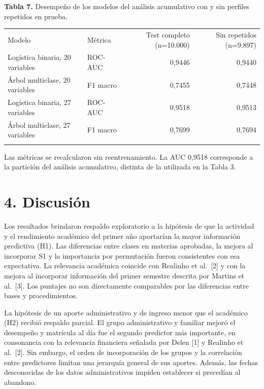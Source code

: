 \documentclass[10pt,a4paper]{article}
\newenvironment{tabla}{\par\begingroup\small
  \setlength{\LTpre}{2pt}\setlength{\LTpost}{2pt}\setlength{\tabcolsep}{4.5pt}
  \renewcommand{\arraystretch}{1.08}}{\endgroup\par}
\newcommand{\epigrafetabla}[1]{\noindent\begin{minipage}{\linewidth}\small\justifying\noindent #1\end{minipage}\par\vspace{2pt}}
\newcommand{\notatabla}[1]{\vspace{3pt}\noindent\begin{minipage}{\linewidth}\footnotesize\justifying\noindent #1\end{minipage}\par}
\renewcommand{\toprule}{\specialrule{1pt}{2pt}{2pt}}
\renewcommand{\bottomrule}{\specialrule{1pt}{2pt}{0pt}}
\renewcommand{\midrule}{\specialrule{.5pt}{2pt}{2pt}}
\begin{document}
\begin{table}[!htbp]
\begin{tabla}
\epigrafetabla{\textbf{Tabla 7.} Desempeño de los modelos del análisis acumulativo con
y sin perfiles repetidos en prueba.}
\begin{tabular*}{\linewidth}{@{\extracolsep{\fill}}llrr@{}}
\toprule\noalign{}
Modelo & Métrica & Test completo (n=10.000) & Sin repetidos (n=9.897) \\
\midrule\noalign{}
Logística binaria, 20 variables & ROC-AUC & 0,9446 & 0,9440 \\
Árbol multiclase, 20 variables & F1 macro & 0,7455 & 0,7448 \\
Logística binaria, 27 variables & ROC-AUC & 0,9518 & 0,9513 \\
Árbol multiclase, 27 variables & F1 macro & 0,7699 & 0,7694 \\
\bottomrule
\end{tabular*}
\notatabla{Las métricas se recalcularon sin reentrenamiento. La AUC 0,9518
corresponde a la partición del análisis acumulativo, distinta de la
utilizada en la Tabla 3.}
\end{tabla}
\end{table}

\hypertarget{discusiuxf3n}{%
\section{4. Discusión}\label{discusiuxf3n}}

Los resultados brindaron respaldo exploratorio a la hipótesis de que la actividad y el rendimiento académico del primer año aportarían la mayor
información predictiva (H1). Las diferencias entre clases en materias aprobadas, la mejora al incorporar S1 y la importancia por permutación fueron
consistentes con esa expectativa. La relevancia académica coincide con Realinho et al.~{[}2{]} y con la mejora al incorporar información del primer
semestre descrita por Martins et al.~{[}3{]}. Los puntajes no son directamente comparables por las diferencias entre bases y procedimientos.

La hipótesis de un aporte administrativo y de ingreso menor que el académico (H2) recibió respaldo parcial. El grupo administrativo y familiar mejoró
el desempeño y matrícula al día fue el segundo predictor más importante, en consonancia con la relevancia financiera señalada por Delen {[}1{]} y
Realinho et al.~{[}2{]}. Sin embargo, el orden de incorporación de los grupos y la correlación entre predictores limitan una jerarquía general de sus
aportes. Además, las fechas desconocidas de los datos administrativos impiden establecer si precedían al abandono.
\end{document}
